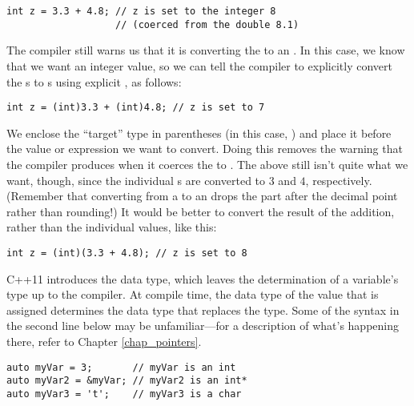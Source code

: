 \noindent\begin{minipage}{\linewidth}\begin{lstlisting}
int z = 3.3 + 4.8; // z is set to the integer 8 
                   // (coerced from the double 8.1)
\end{lstlisting}\end{minipage}

The compiler still warns us that it is converting the  to an . 
In this case, we know that we want an integer value, so we can tell the compiler to explicitly convert the s to s using explicit , as follows:

\noindent\begin{minipage}{\linewidth}\begin{lstlisting}
int z = (int)3.3 + (int)4.8; // z is set to 7
\end{lstlisting}\end{minipage}

We enclose the ``target'' type in parentheses (in this case, ) and place it before the value or expression we want to convert. 
Doing this removes the warning that the compiler produces when it coerces the  to . 
The above still isn't quite what we want, though, since the individual s are converted to $3$ and $4$, respectively. 
(Remember that converting from a  to an  drops the part after the decimal point rather than rounding!) 
It would be better to convert the result of the addition, rather than the individual values, like this: \nopagebreak[4]

\noindent\begin{minipage}{\linewidth}\begin{lstlisting}
int z = (int)(3.3 + 4.8); // z is set to 8
\end{lstlisting}\end{minipage}


C++11 introduces the  data type, which leaves the determination of a variable's type up to the compiler. 
At compile time, the data type of the value that is assigned determines the data type that replaces the  type. Some of the syntax in the second line below may be unfamiliar---for a description of what's happening there, refer to Chapter \ref{chap_pointers}.

\noindent\begin{minipage}{\linewidth}\begin{lstlisting}
auto myVar = 3;       // myVar is an int
auto myVar2 = &myVar; // myVar2 is an int*
auto myVar3 = 't';    // myVar3 is a char
\end{lstlisting}\end{minipage}

